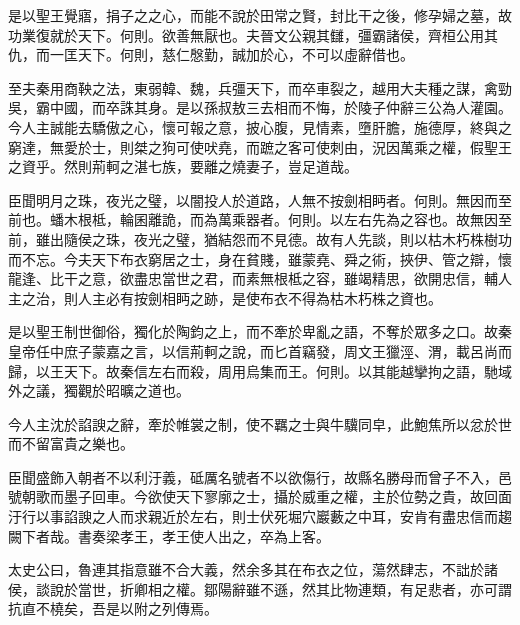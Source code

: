 是以聖王覺寤，捐子之之心，而能不說於田常之賢，封比干之後，修孕婦之墓，故功業復就於天下。何則。欲善無厭也。夫晉文公親其讎，彊霸諸侯，齊桓公用其仇，而一匡天下。何則，慈仁慇勤，誠加於心，不可以虛辭借也。

至夫秦用商鞅之法，東弱韓、魏，兵彊天下，而卒車裂之，越用大夫種之謀，禽勁吳，霸中國，而卒誅其身。是以孫叔敖三去相而不悔，於陵子仲辭三公為人灌園。今人主誠能去驕傲之心，懷可報之意，披心腹，見情素，墮肝膽，施德厚，終與之窮達，無愛於士，則桀之狗可使吠堯，而蹠之客可使刺由，況因萬乘之權，假聖王之資乎。然則荊軻之湛七族，要離之燒妻子，豈足道哉。

臣聞明月之珠，夜光之璧，以闇投人於道路，人無不按劍相眄者。何則。無因而至前也。蟠木根柢，輪囷離詭，而為萬乘器者。何則。以左右先為之容也。故無因至前，雖出隨侯之珠，夜光之璧，猶結怨而不見德。故有人先談，則以枯木朽株樹功而不忘。今夫天下布衣窮居之士，身在貧賤，雖蒙堯、舜之術，挾伊、管之辯，懷龍逢、比干之意，欲盡忠當世之君，而素無根柢之容，雖竭精思，欲開忠信，輔人主之治，則人主必有按劍相眄之跡，是使布衣不得為枯木朽株之資也。

是以聖王制世御俗，獨化於陶鈞之上，而不牽於卑亂之語，不奪於眾多之口。故秦皇帝任中庶子蒙嘉之言，以信荊軻之說，而匕首竊發，周文王獵涇、渭，載呂尚而歸，以王天下。故秦信左右而殺，周用烏集而王。何則。以其能越攣拘之語，馳域外之議，獨觀於昭曠之道也。

今人主沈於諂諛之辭，牽於帷裳之制，使不羈之士與牛驥同皁，此鮑焦所以忿於世而不留富貴之樂也。

臣聞盛飾入朝者不以利汙義，砥厲名號者不以欲傷行，故縣名勝母而曾子不入，邑號朝歌而墨子回車。今欲使天下寥廓之士，攝於威重之權，主於位勢之貴，故回面汙行以事諂諛之人而求親近於左右，則士伏死堀穴巖藪之中耳，安肯有盡忠信而趨闕下者哉。書奏梁孝王，孝王使人出之，卒為上客。

太史公曰，魯連其指意雖不合大義，然余多其在布衣之位，蕩然肆志，不詘於諸侯，談說於當世，折卿相之權。鄒陽辭雖不遜，然其比物連類，有足悲者，亦可謂抗直不橈矣，吾是以附之列傳焉。